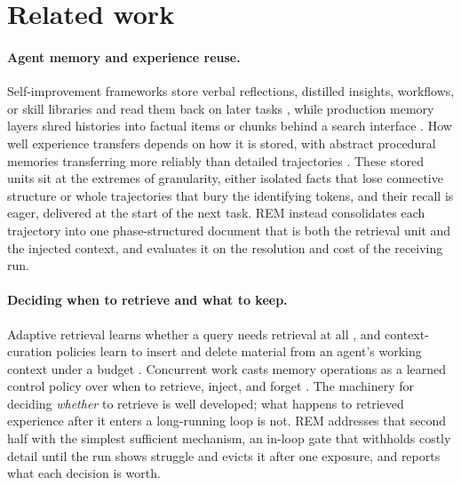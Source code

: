 \documentclass{article}
\newcommand{\sysname}{REM}
\begin{document}
\section{Related work}
\label{sec:related}

\paragraph{Agent memory and experience reuse.} Self-improvement frameworks store verbal reflections, distilled insights, workflows, or skill libraries and read them back on later tasks \citep{shinn2023reflexion, zhao2024expel, wang2024awm, wang2023voyager}, while production memory layers shred histories into factual items or chunks behind a search interface \citep{chhikara2025mem0}. How well experience transfers depends on how it is stored, with abstract procedural memories transferring more reliably than detailed trajectories \citep{hu2026continual}. These stored units sit at the extremes of granularity, either isolated facts that lose connective structure or whole trajectories that bury the identifying tokens, and their recall is eager, delivered at the start of the next task.  \sysname{} instead consolidates each trajectory into one phase-structured document that is both the retrieval unit and the injected context, and evaluates it on the resolution and cost of the receiving run.

\paragraph{Deciding when to retrieve and what to keep.} Adaptive retrieval learns whether a query needs retrieval at all \citep{asai2024selfrag}, and context-curation policies learn to insert and delete material from an agent's working context under a budget \citep{zhang2026memact}. Concurrent work casts memory operations as a learned control policy over when to retrieve, inject, and forget \citep{jiang2026memcon}. The machinery for deciding \emph{whether} to retrieve is well developed; what happens to retrieved experience after it enters a long-running loop is not. \sysname{} addresses that second half with the simplest sufficient mechanism, an in-loop gate that withholds costly detail until the run shows struggle and evicts it after one exposure, and reports what each decision is worth.
\end{document}
